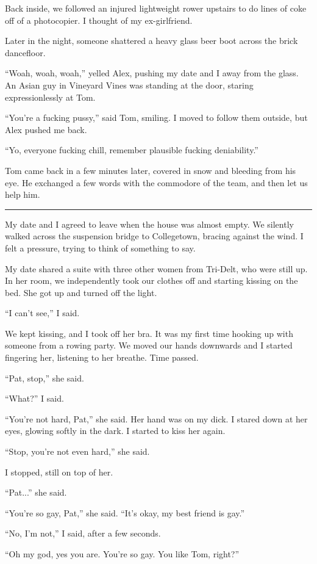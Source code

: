 Back inside, we followed an injured lightweight rower upstairs to do lines of
coke off of a photocopier.  I thought of my ex-girlfriend.

Later in the night, someone shattered a heavy glass beer boot across the brick
dancefloor.

``Woah, woah, woah,'' yelled Alex, pushing my date and I away from the glass.
An Asian guy in Vineyard Vines was standing at the door, staring
expressionlessly at Tom.

``You're a fucking pussy,'' said Tom, smiling.  I moved to follow them outside,
but Alex pushed me back.

``Yo, everyone fucking chill, remember plausible fucking deniability.''

Tom came back in a few minutes later, covered in snow and bleeding from his eye.
He exchanged a few words with the commodore of the team, and then let us help
him.

\plainfancybreak{12pt}{2}{}

My date and I agreed to leave when the house was almost empty.  We silently
walked across the suspension bridge to Collegetown, bracing against the wind.  I
felt a pressure, trying to think of something to say.

My date shared a suite with three other women from Tri-Delt, who were still up.
In her room, we independently took our clothes off and starting kissing on the
bed.  She got up and turned off the light.

``I can't see,'' I said.

We kept kissing, and I took off her bra.  It was my first time hooking up with
someone from a rowing party.  We moved our hands downwards and I started
fingering her, listening to her breathe.  Time passed.

``Pat, stop,'' she said.

``What?'' I said.

``You're not hard, Pat,'' she said.  Her hand was on my dick.  I stared down at
her eyes, glowing softly in the dark.  I started to kiss her again.

``Stop, you're not even hard,'' she said.

I stopped, still on top of her.

``Pat...'' she said.

``You're so gay, Pat,'' she said.  ``It's okay, my best friend is gay.''

``No, I'm not,'' I said, after a few seconds.

``Oh my god, yes you are.  You're so gay.  You like Tom, right?''

